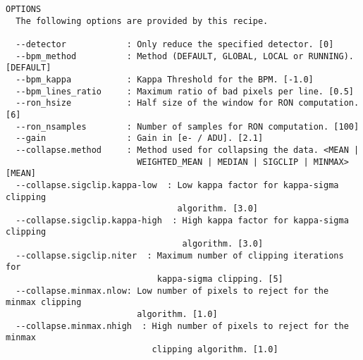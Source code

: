 \begin{verbatim}
OPTIONS
  The following options are provided by this recipe.

  --detector            : Only reduce the specified detector. [0]
  --bpm_method          : Method (DEFAULT, GLOBAL, LOCAL or RUNNING). [DEFAULT]
  --bpm_kappa           : Kappa Threshold for the BPM. [-1.0]
  --bpm_lines_ratio     : Maximum ratio of bad pixels per line. [0.5]
  --ron_hsize           : Half size of the window for RON computation. [6]
  --ron_nsamples        : Number of samples for RON computation. [100]
  --gain                : Gain in [e- / ADU]. [2.1]
  --collapse.method     : Method used for collapsing the data. <MEAN |
                          WEIGHTED_MEAN | MEDIAN | SIGCLIP | MINMAX> [MEAN]
  --collapse.sigclip.kappa-low  : Low kappa factor for kappa-sigma clipping
                                  algorithm. [3.0]
  --collapse.sigclip.kappa-high  : High kappa factor for kappa-sigma clipping
                                   algorithm. [3.0]
  --collapse.sigclip.niter  : Maximum number of clipping iterations for
                              kappa-sigma clipping. [5]
  --collapse.minmax.nlow: Low number of pixels to reject for the minmax clipping
                          algorithm. [1.0]
  --collapse.minmax.nhigh  : High number of pixels to reject for the minmax
                             clipping algorithm. [1.0]

\end{verbatim}
